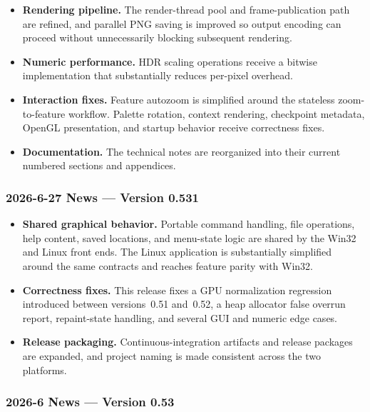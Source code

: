 \begin{itemize}
\item \textbf{Rendering pipeline.} The render-thread pool and frame-publication
  path are refined, and parallel PNG saving is improved so output encoding can
  proceed without unnecessarily blocking subsequent rendering.

\item \textbf{Numeric performance.} HDR scaling operations receive a bitwise
  implementation that substantially reduces per-pixel overhead.

\item \textbf{Interaction fixes.} Feature autozoom is simplified around the
  stateless zoom-to-feature workflow. Palette rotation, context rendering,
  checkpoint metadata, OpenGL presentation, and startup behavior receive
  correctness fixes.

\item \textbf{Documentation.} The technical notes are reorganized into their
  current numbered sections and appendices.
\end{itemize}

\subsubsection{2026-6-27 News --- Version 0.531}

\begin{itemize}
\item \textbf{Shared graphical behavior.} Portable command handling, file
  operations, help content, saved locations, and menu-state logic are shared by
  the Win32 and Linux front ends. The Linux application is substantially
  simplified around the same contracts and reaches feature parity with Win32.

\item \textbf{Correctness fixes.} This release fixes a GPU normalization
  regression introduced between versions~0.51 and~0.52, a heap allocator false
  overrun report, repaint-state handling, and several GUI and numeric edge cases.

\item \textbf{Release packaging.} Continuous-integration artifacts and release
  packages are expanded, and project naming is made consistent across the two
  platforms.
\end{itemize}

\subsubsection{2026-6 News --- Version 0.53}

